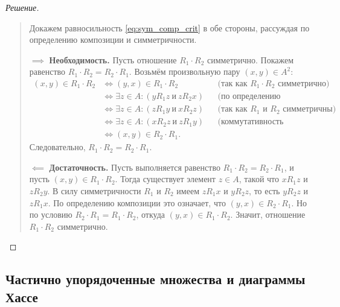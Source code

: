 \begin{proof}[Решение]~\\
    \begin{quote}
        Докажем равносильность \eqref{eq:sym_comp_crit} в обе стороны, 
        рассуждая по определению композиции и симметричности.

        $\implies$ \textbf{Необходимость.} Пусть отношение $R_1 \cdot R_2$ 
        симметрично. Покажем равенство $R_1 \cdot R_2 = R_2 \cdot R_1$. 
        Возьмём произвольную пару $(x, y) \in A^2$:
        \begin{align*}
            (x, y) \in R_1 \cdot R_2 
            &\iff (y, x) \in R_1 \cdot R_2 
            &&\text{(так как } R_1 \cdot R_2 \text{ симметрично)} \\
            &\iff \exists z \in A : (y R_1 z \ \text{и} \ z R_2 x) 
            &&\text{(по определению композиции)} \\
            &\iff \exists z \in A : (z R_1 y \ \text{и} \ x R_2 z) 
            &&\text{(так как } R_1 \text{ и } R_2 \text{ симметричны)} \\
            &\iff \exists z \in A : (x R_2 z \ \text{и} \ z R_1 y) 
            &&\text{(коммутативность конъюнкции)} \\
            &\iff (x, y) \in R_2 \cdot R_1.
        \end{align*}
        Следовательно, $R_1 \cdot R_2 = R_2 \cdot R_1$.

        $\impliedby$ \textbf{Достаточность.} Пусть выполняется равенство 
        $R_1 \cdot R_2 = R_2 \cdot R_1$, и пусть $(x, y) \in R_1 \cdot R_2$. 
        Тогда существует элемент $z \in A$, такой что $x R_1 z$ и $z R_2 y$. 
        В силу симметричности $R_1$ и $R_2$ имеем $z R_1 x$ и $y R_2 z$, 
        то есть $y R_2 z$ и $z R_1 x$. По определению композиции это 
        означает, что $(y, x) \in R_2 \cdot R_1$. Но по условию 
        $R_2 \cdot R_1 = R_1 \cdot R_2$, откуда $(y, x) \in R_1 \cdot R_2$. 
        Значит, отношение $R_1 \cdot R_2$ симметрично.
    \end{quote}
\end{proof}

\subsection{Частично упорядоченные множества и диаграммы Хассе}


